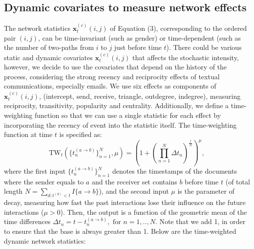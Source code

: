 \documentclass[a4paper]{article}
\begin{document}
 \subsection{Dynamic covariates to measure network effects} \label{subsec: Dynamic covariates}
The network statistics $\boldsymbol{x}^{(c)}_t(i, j)$ of Equation (3), corresponding to the ordered pair $(i, j)$, can be time-invariant (such as gender) or time-dependent (such as the number of two-paths from $i$ to $j$ just before time $t$). There could be various static and dynamic covariates $\boldsymbol{x}^{(c)}_t(i, j)$ that affects the stochastic intensity, however, we decide to use the covariates that depend on the history of the process, considering the strong recency and reciprocity effects of textual communications, especially emails.
 We use six effects as components of $\boldsymbol{x}^{(c)}_t(i, j)$, (intercept, send, receive, triangle, outdegree, indegree), measuring reciprocity, transitivity, popularity and centrality. Additionally, we define a time-weighting function so that we can use a single statistic for each effect by incorporating the recency of event into the statistic itself. The time-weighting function at time $t$ is specified as:
 \begin{equation}
 \mbox{TW}_t(\{t_n^{(a\rightarrow b)}\}_{n=1}^N, \mu) = (1+(\prod\limits_{n=1}^N\Delta t_n)^{\frac{1}{N}})^\mu,
 \end{equation}
 where the first input $\{t_n^{(a\rightarrow b)}\}_{n=1}^N$ denotes the timestamps of the documents where the sender equals to $a$ and the receiver set contains $b$ before time $t$ (of total length $N = \sum_{d: t^{(d)}<t} I\{a\rightarrow b\}$), and the second input $\mu$ is the parameter of decay, measuring how fast the past interactions lose their influence on the future interactions ($\mu >0$). Then, the output is a function of the geometric mean of the time differences $\Delta t_n=t-t_n^{(a\rightarrow b)}, \mbox{ for } n=1,..,N$. Note that we add 1, in order to ensure that the base is always greater than 1. Below are the time-weighted dynamic network statistics:
\end{document}
